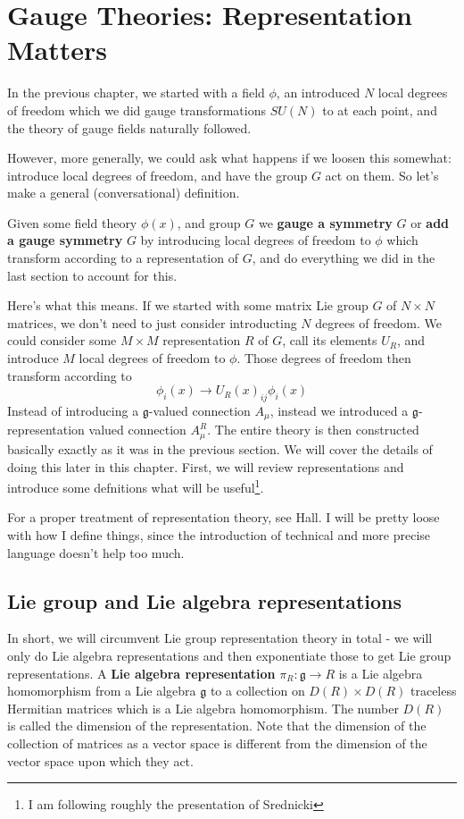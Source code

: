 \documentclass{book}
\begin{document}
\chapter{Gauge Theories: Representation Matters}
In the previous chapter, we started with a field $\phi$, an introduced $N$ local degrees of freedom which we did gauge transformations $SU(N)$ to at each point, and the theory of gauge fields naturally followed.

However, more generally, we could ask what happens if we loosen this somewhat: introduce local degrees of freedom, and have the group $G$ act on them. So let's make a general (conversational) definition.

\begin{defn}
Given some field theory $\phi(x)$, and group $G$ we \textbf{gauge a symmetry} $G$ or \textbf{add a gauge symmetry} $G$ by introducing local degrees of freedom to $\phi$ which transform according to a representation of $G$, and do everything we did in the last section to account for this.
\end{defn}

Here's what this means. If we started  with some matrix Lie group $G$ of $N \times N$ matrices, we don't need to just consider introducting $N$ degrees of freedom. We could consider some $M \times M$ representation $R$ of $G$, call its elements $U_R$, and introduce $M$ local degrees of freedom to $\phi$. Those degrees of freedom then transform according to 
\[
\phi_i (x)\to U_R (x)_{ij} \phi_i (x)
\]
Instead of introducing a $\mathfrak{g}$-valued connection $A_\mu$, instead we introduced a $\mathfrak{g}$-representation valued connection $A_\mu^R$. The entire theory is then constructed basically exactly as it was in the previous section. We will cover the details of doing this later in this chapter. First, we will review representations and introduce some defnitions what will be useful\footnote{I am following roughly the presentation of Srednicki\cite{Sred1}}.

For a proper treatment of representation theory, see Hall\cite{Hall1}. I will be pretty loose with how I define things, since the introduction of technical and more precise language doesn't help too much.

\newpage
\section{Lie group and Lie algebra representations}
In short, we will circumvent Lie group representation theory in total - we will only do Lie algebra representations and then exponentiate those to get Lie group representations. A \textbf{Lie algebra representation} $\pi_R: \mathfrak{g} \to R$ is a Lie algebra homomorphism from a Lie algebra $\mathfrak{g}$ to a collection on $D(R) \times D(R)$ traceless Hermitian matrices which is a Lie algebra homomorphism. The number $D(R)$ is called the dimension of the representation. Note that the dimension of the collection of matrices as a vector space is different from the dimension of the vector space upon which they act. 
\end{document}
